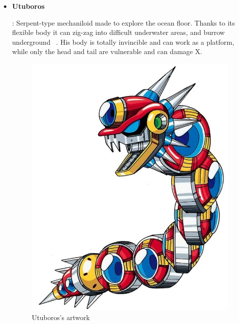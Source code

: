 \begin{itemize}
		\item \hypertarget{miniboss:Utuboros}{\textbf{Utuboros}}: Serpent-type mechaniloid made to explore the ocean floor. Thanks to its flexible body it can zig-zag into difficult underwater areas, and burrow underground ~\cite{wayback:X_resources}. His body is totally invincible and can work as a platform, while only the head and tail are vulnerable and can damage X.
		\begin{figure}[htp]
			\centering
			\includegraphics[width=0.5\linewidth]{figures/X1/enemies/Utuboros.jpg}
			\caption{Utuboros's artwork}
		\end{figure}
	\end{itemize}

